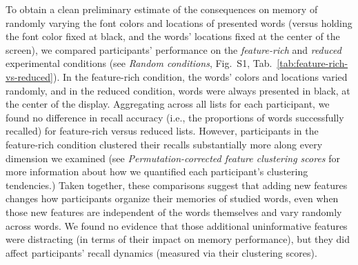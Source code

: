 \documentclass[11pt]{article}
\newcommand{\dynamicsRandom}{S1}
\begin{document}
To obtain a clean preliminary estimate of the consequences on memory of
randomly varying the font colors and locations of presented words (versus
holding the font color fixed at black, and the words' locations fixed at the
center of the screen), we compared participants' performance on the
\textit{feature-rich} and \textit{reduced} experimental conditions (see
\textit{Random conditions}, Fig.~\dynamicsRandom,
Tab.~\ref{tab:feature-rich-vs-reduced}). In the feature-rich condition, the
words' colors and locations varied randomly, and in the reduced condition,
words were always presented in black, at the center of the display. Aggregating
across all lists for each participant, we found no difference in recall
accuracy (i.e., the proportions of words successfully recalled) for
feature-rich versus reduced lists. However, participants in the feature-rich
condition clustered their recalls substantially more along every dimension we
examined (see \textit{Permutation-corrected feature clustering scores} for more
information about how we quantified each participant's clustering tendencies.)
Taken together, these comparisons suggest that adding new features changes how
participants organize their memories of studied words, even when those new
features are independent of the words themselves and vary randomly across
words. We found no evidence that those additional uninformative features were
distracting (in terms of their impact on memory performance), but they did
affect participants' recall dynamics (measured via their clustering scores).
\end{document}
